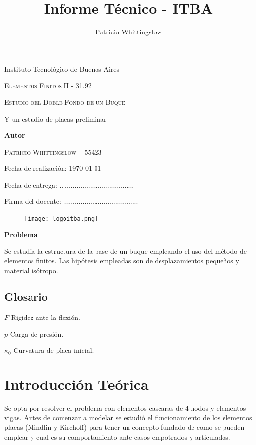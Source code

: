 \documentclass[onecolumn,10pt,titlepage]{article}
\title{Informe Técnico - ITBA}
\author{Patricio Whittingslow}
\newcommand{\glossentry}[2]{$#1$ \indent #2 \par \vspace{.4cm} }
\begin{document}
\begin{titlepage}
	\centering
	
	{ \large Instituto Tecnológico de Buenos Aires  \par }
	\vspace{2cm}
	{\Large \scshape Elementos Finitos II - 31.92 \par}
	\vspace{2cm}
	{\Huge \scshape Estudio del Doble Fondo de un Buque\par }
	\vspace{.5cm}
	{\Large Y un estudio de placas preliminar \par}
	\vspace{2cm}
	{\large \bf Autor \par}
	\vspace{.5cm}
	\textsc{\large Patricio Whittingslow -- 55423}
	\vspace{2cm}
	{\par \large Fecha de realización: \today \par}
	\vspace{1cm}
	{\large Fecha de entrega: .......................................\par}
	\vspace{2.5cm}
	{\large Firma del docente: .......................................}
	\vspace{3cm}
	\begin{figure}[htb!]
		\centering
		\texttt{[image: logoitba.png]}
	\end{figure}
\end{titlepage}


{\textbf{Problema}}\par
Se estudia la estructura de la base de un buque empleando el uso del método de elementos finitos. Las hipótesis empleadas son de desplazamientos pequeños y material isótropo.

\begin{multicols}{2}
	\section*{Glosario}
	\glossentry{F}{Rigidez ante la flexión.}
	\glossentry{p}{Carga de presión.}
	\glossentry{\kappa_{0}}{Curvatura de placa inicial.}
\end{multicols}


\tableofcontents


\section{Introducción Teórica}
Se opta por resolver el problema con elementos cascaras de 4 nodos y elementos vigas. Antes de comenzar a modelar se estudió el funcionamiento de los elementos placas (Mindlin y Kirchoff) para tener un concepto fundado de como se pueden emplear y cual es su comportamiento ante casos empotrados y articulados.
\end{document}
